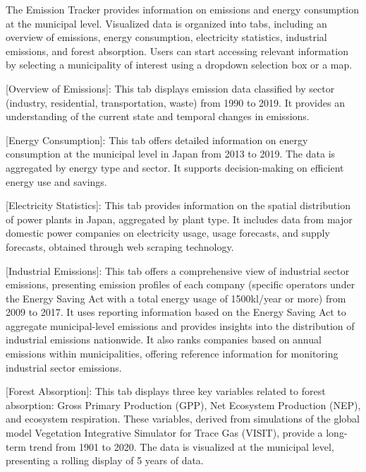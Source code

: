 The Emission Tracker provides information on emissions and energy consumption at the municipal level. Visualized data is organized into tabs, including an overview of emissions, energy consumption, electricity statistics, industrial emissions, and forest absorption. Users can start accessing relevant information by selecting a municipality of interest using a dropdown selection box or a map.\par

[Overview of Emissions]: This tab displays emission data classified by sector (industry, residential, transportation, waste) from 1990 to 2019. It provides an understanding of the current state and temporal changes in emissions.\par

[Energy Consumption]: This tab offers detailed information on energy consumption at the municipal level in Japan from 2013 to 2019. The data is aggregated by energy type and sector. It supports decision-making on efficient energy use and savings.\par

[Electricity Statistics]: This tab provides information on the spatial distribution of power plants in Japan, aggregated by plant type. It includes data from major domestic power companies on electricity usage, usage forecasts, and supply forecasts, obtained through web scraping technology.\par

[Industrial Emissions]: This tab offers a comprehensive view of industrial sector emissions, presenting emission profiles of each company (specific operators under the Energy Saving Act with a total energy usage of 1500kl/year or more) from 2009 to 2017. It uses reporting information based on the Energy Saving Act to aggregate municipal-level emissions and provides insights into the distribution of industrial emissions nationwide. It also ranks companies based on annual emissions within municipalities, offering reference information for monitoring industrial sector emissions.\par

[Forest Absorption]: This tab displays three key variables related to forest absorption: Gross Primary Production (GPP), Net Ecosystem Production (NEP), and ecosystem respiration. These variables, derived from simulations of the global model Vegetation Integrative Simulator for Trace Gas (VISIT), provide a long-term trend from 1901 to 2020. The data is visualized at the municipal level, presenting a rolling display of 5 years of data.\par

